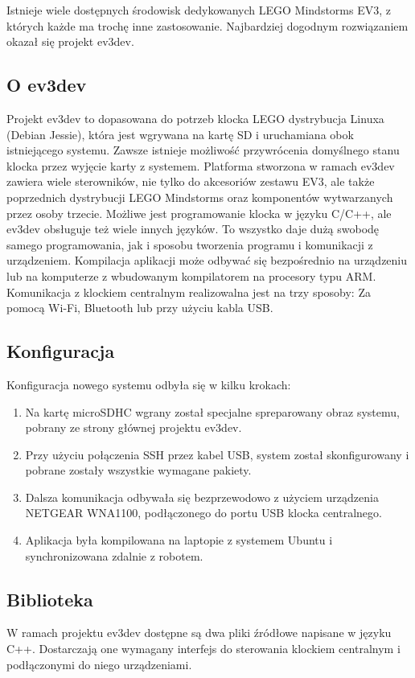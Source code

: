 Istnieje wiele dostępnych środowisk dedykowanych LEGO Mindstorms EV3, z których każde ma trochę inne zastosowanie. Najbardziej dogodnym rozwiązaniem okazał się projekt ev3dev.

\subsection{O ev3dev}
Projekt ev3dev to dopasowana do potrzeb klocka LEGO dystrybucja Linuxa (Debian Jessie), która jest wgrywana na kartę SD i uruchamiana obok istniejącego systemu. Zawsze istnieje możliwość przywrócenia domyślnego stanu klocka przez wyjęcie karty z systemem. Platforma stworzona w ramach ev3dev zawiera wiele sterowników, nie tylko do akcesoriów zestawu EV3, ale także poprzednich dystrybucji LEGO Mindstorms oraz komponentów wytwarzanych przez osoby trzecie. Możliwe jest programowanie klocka w języku C/C++, ale ev3dev obsługuje też wiele innych języków. To wszystko daje dużą swobodę samego programowania, jak i sposobu tworzenia programu i komunikacji z urządzeniem. Kompilacja aplikacji może odbywać się bezpośrednio na urządzeniu lub na komputerze z wbudowanym kompilatorem na procesory typu ARM. Komunikacja z klockiem centralnym realizowalna jest na trzy sposoby: Za pomocą Wi-Fi, Bluetooth lub przy użyciu kabla USB.

\subsection{Konfiguracja}
Konfiguracja nowego systemu odbyła się w kilku krokach:

\begin{enumerate}
    \item Na kartę microSDHC wgrany został specjalne spreparowany obraz systemu, pobrany ze strony głównej projektu ev3dev.
    \item Przy użyciu połączenia SSH przez kabel USB, system został skonfigurowany i pobrane zostały wszystkie wymagane pakiety.
    \item Dalsza komunikacja odbywała się bezprzewodowo z użyciem urządzenia NETGEAR WNA1100, podłączonego do portu USB klocka centralnego.
    \item Aplikacja była kompilowana na laptopie z systemem Ubuntu i synchronizowana zdalnie z robotem.
\end{enumerate}

\subsection{Biblioteka}
W ramach projektu ev3dev dostępne są dwa pliki źródłowe napisane w języku C++. Dostarczają one wymagany interfejs do sterowania klockiem centralnym i podłączonymi do niego urządzeniami.\\

